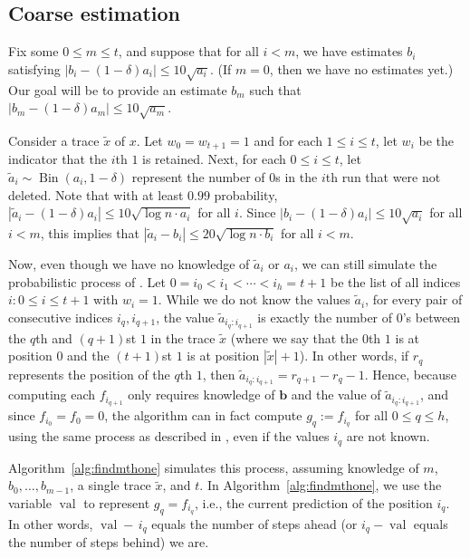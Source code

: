 \documentclass[12pt]{article}
\theoremstyle{definition}
\theoremstyle{remark}
\DeclareMathOperator{\Bin}{Bin}
\DeclareMathOperator{\val}{val}
\newcommand{\bb}{\mathbf b}
\begin{document}
\subsection{Coarse estimation}

Fix some $0 \le m \le t$, and suppose that for all $i < m$, we have estimates $b_i$ satisfying $|b_i-(1-\delta) a_i| \le 10 \sqrt{a_i}$. (If $m = 0$, then we have no estimates yet.) Our goal will be to provide an estimate $b_m$ such that $|b_m-(1-\delta) a_m| \le 10 \sqrt{a_m}$.

Consider a trace $\tilde{x}$ of $x$. Let $w_0 = w_{t+1} = 1$ and for each $1 \le i \le t$, let $w_i$ be the indicator that the $i$th $1$ is retained. Next, for each $0 \le i \le t$, let $\tilde{a}_i \sim \Bin(a_i, 1-\delta)$ represent the number of $0$s in the $i$th run that were not deleted. Note that with at least $0.99$ probability, $|\tilde{a}_i-(1-\delta) a_i| \le 10 \sqrt{\log n \cdot a_i}$ for all $i$. Since $|b_i-(1-\delta) a_i| \le 10 \sqrt{a_i}$ for all $i < m$, this implies that $|\tilde{a}_i-b_i| \le 20 \sqrt{\log n \cdot b_i}$ for all $i < m$.

Now, even though we have no knowledge of $\tilde{a}_i$ or $a_i$, we can still simulate the probabilistic process of . Let $0 = i_0 < i_1 < \cdots < i_h = t+1$ be the list of all indices $i: 0 \le i \le t+1$ with $w_i = 1$. While we do not know the values $\tilde{a}_i$, for every pair of consecutive indices $i_q, i_{q+1}$, the value $\tilde{a}_{i_q:i_{q+1}}$ is exactly the number of $0$'s between the $q$th and $(q+1)$st $1$ in the trace $\tilde{x}$ (where we say that the $0$th $1$ is at position $0$ and the $(t+1)$st $1$ is at position $|\tilde{x}|+1$). In other words, if $r_q$ represents the position of the $q$th $1$, then $\tilde{a}_{i_q:i_{q+1}} = r_{q+1}-r_q-1$. Hence, because computing each $f_{i_{q+1}}$ only requires knowledge of $\bb$ and the value of $\tilde{a}_{i_q:i_{q+1}}$, and since $f_{i_0} = f_0 = 0$, the algorithm can in fact compute $g_q := f_{i_q}$ for all $0 \le q \le h$, using the same process as described in , even if the values $i_q$ are not known.

Algorithm~\ref{alg:findmthone} simulates this process, assuming knowledge of $m$, $b_0, \dots, b_{m-1}$, a single trace $\tilde{x}$, and $t$. In Algorithm~\ref{alg:findmthone}, we use the variable $\val$ to represent $g_q = f_{i_q}$, i.e., the current prediction of the position $i_q$. In other words, $\val - \, i_q$ equals the number of steps ahead (or $i_q - \val$ equals the number of steps behind) we are. 
\end{document}
